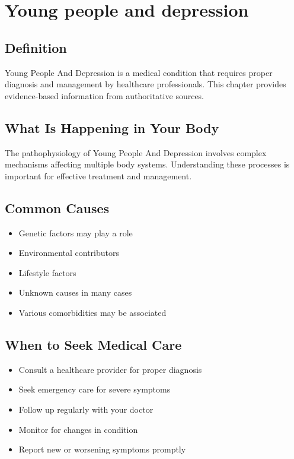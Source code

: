
\chapter{Young people and depression}

\section*{Definition}
Young People And Depression is a medical condition that requires proper diagnosis and management by healthcare professionals. This chapter provides evidence-based information from authoritative sources.

\section*{What Is Happening in Your Body}
The pathophysiology of Young People And Depression involves complex mechanisms affecting multiple body systems. Understanding these processes is important for effective treatment and management.

\section*{Common Causes}
\begin{itemize}
  \item Genetic factors may play a role
  \item Environmental contributors
  \item Lifestyle factors
  \item Unknown causes in many cases
  \item Various comorbidities may be associated
\end{itemize}

\section*{When to Seek Medical Care}
\begin{itemize}
  \item Consult a healthcare provider for proper diagnosis
  \item Seek emergency care for severe symptoms
  \item Follow up regularly with your doctor
  \item Monitor for changes in condition
  \item Report new or worsening symptoms promptly
\end{itemize}

